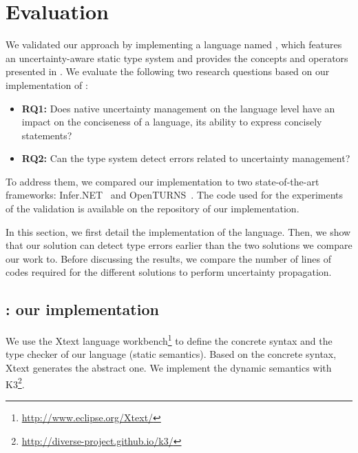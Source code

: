\section{Evaluation}
\label{sec:aintea:validation}

We validated our approach by implementing a language named \langName{}, which features an uncertainty-aware static type system and provides the concepts and operators presented in .
We evaluate the following two research questions based on our implementation of \langName{}:
\begin{itemize}
	\vspace{-0.5em}
	\setlength\itemsep{-0.3em}
	\item \textbf{RQ1:} Does native uncertainty management on the language level have an impact on the conciseness of a language, \ie its ability to express concisely statements? 
	\item \textbf{RQ2:} Can the type system detect errors related to uncertainty management?
\end{itemize}

To address them, we compared our implementation to two state-of-the-art frameworks: Infer.NET~\cite{url:InferNET18} and OpenTURNS~\cite{baudin2017openturns}.
The code used for the experiments of the validation is available on the repository of our implementation.

In this section, we first detail the implementation of the \langName{} language.
Then, we show that our solution can detect type errors earlier than the two solutions we compare our work to.
Before discussing the results, we compare the number of lines of codes required for the different solutions to perform uncertainty propagation.

\subsection[Ain'tea: our implementation]{\langName{}: our implementation}
\label{sec:uminijava}

We use the Xtext language workbench\footnote{\url{http://www.eclipse.org/Xtext/}} to define the concrete syntax and the type checker of our language (static semantics).
Based on the concrete syntax, Xtext generates the abstract one.
We implement the dynamic semantics with K3\footnote{\url{http://diverse-project.github.io/k3/}}. 


